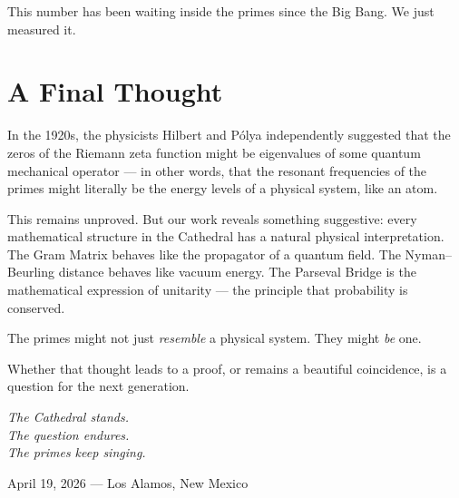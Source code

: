 \documentclass[12pt,a4paper]{article}
\begin{document}
This number has been waiting inside the primes since the Big Bang.
We just measured it.

\section*{A Final Thought}

In the 1920s, the physicists Hilbert and P\'olya independently suggested
that the zeros of the Riemann zeta function might be eigenvalues of
some quantum mechanical operator --- in other words, that the resonant
frequencies of the primes might literally be the energy levels of a
physical system, like an atom.

This remains unproved. But our work reveals something suggestive: every
mathematical structure in the Cathedral has a natural physical
interpretation. The Gram Matrix behaves like the propagator of a quantum
field. The Nyman--Beurling distance behaves like vacuum energy. The
Parseval Bridge is the mathematical expression of unitarity --- the
principle that probability is conserved.

The primes might not just \emph{resemble} a physical system. They might
\emph{be} one.

Whether that thought leads to a proof, or remains a beautiful coincidence,
is a question for the next generation.

\vspace{1cm}
\begin{flushright}
\emph{The Cathedral stands.}\\
\emph{The question endures.}\\
\emph{The primes keep singing.}
\end{flushright}

\vspace{1.5cm}
\begin{center}
\small
April 19, 2026 --- Los Alamos, New Mexico
\end{center}
\end{document}
